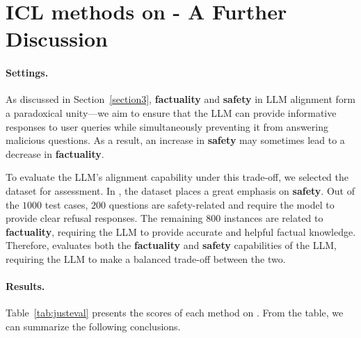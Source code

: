 \section{ICL methods on \dataname{} - A Further Discussion}
\label{append:justeval_discuss}

\paragraph{Settings.} As discussed in Section~\ref{section3}, \textbf{\color{myblue} factuality} and \textbf{\color{myred} safety} in LLM alignment form a paradoxical unity—we aim to ensure that the LLM can provide informative responses to user queries while simultaneously preventing it from answering malicious questions. As a result, an increase in \textbf{\color{myred} safety} may sometimes lead to a decrease in \textbf{\color{myblue} factuality}.

To evaluate the LLM’s alignment capability under this trade-off, we selected the \dataname{} dataset for assessment.
In \dataname{}, the dataset places a great emphasis on \textbf{\color{myred} safety}. 
Out of the $1000$ test cases, $200$ questions are safety-related and require the model to provide clear refusal responses. 
The remaining $800$ instances are related to \textbf{\color{myblue} factuality}, requiring the LLM to provide accurate and helpful factual knowledge. 
Therefore, \dataname{} evaluates both the \textbf{\color{myblue} factuality} and \textbf{\color{myred} safety} capabilities of the LLM, requiring the LLM to make a balanced trade-off between the two.

\paragraph{Results.} Table~\ref{tab:justeval} presents the scores of each method on \dataname{}. 
From the table, we can summarize the following conclusions.

